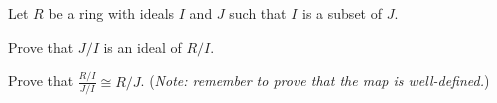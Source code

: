 \begin{problem}\label{problem-ring-isomorphism-3}
    Let $R$ be a ring with ideals $I$ and $J$ such that $I$ is a subset of $J$.
    \begin{partquestions}{\roman*}
        \item Prove that $J/I$ is an ideal of $R/I$.
        \item Prove that $\frac{R/I}{J/I} \cong R/J$.\newline
        (\textit{Note: remember to prove that the map is well-defined.})
    \end{partquestions}
\end{problem}
